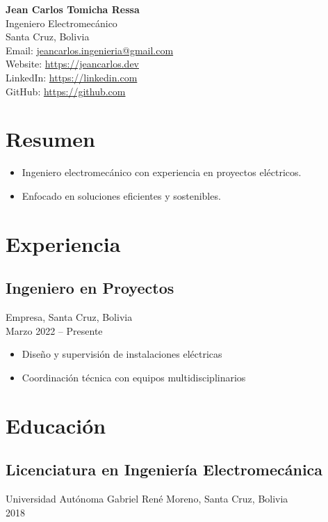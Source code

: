 \documentclass[11pt,a4paper]{article}
\begin{document}
\begin{center}
    {\LARGE \textbf{Jean Carlos Tomicha Ressa}}\\
    {\large Ingeniero Electromecánico}\\
    Santa Cruz, Bolivia\\[0.2cm]
    Email: \href{mailto:jeancarlos.ingenieria@gmail.com}{jeancarlos.ingenieria@gmail.com} \\
    Website: \href{https://jeancarlos.dev}{https://jeancarlos.dev} \\
    LinkedIn: \href{https://linkedin.com}{https://linkedin.com} \\
    GitHub: \href{https://github.com}{https://github.com}
\end{center}

\section*{Resumen}
\begin{itemize}[leftmargin=*]
    \item Ingeniero electromecánico con experiencia en proyectos eléctricos.
    \item Enfocado en soluciones eficientes y sostenibles.
\end{itemize}

\section*{Experiencia}
\subsection*{Ingeniero en Proyectos}
Empresa, Santa Cruz, Bolivia \\
Marzo 2022 -- Presente
\begin{itemize}[leftmargin=*]
    \item Diseño y supervisión de instalaciones eléctricas
    \item Coordinación técnica con equipos multidisciplinarios
\end{itemize}

\section*{Educación}
\subsection*{Licenciatura en Ingeniería Electromecánica}
Universidad Autónoma Gabriel René Moreno, Santa Cruz, Bolivia \\
2018
\end{document}
